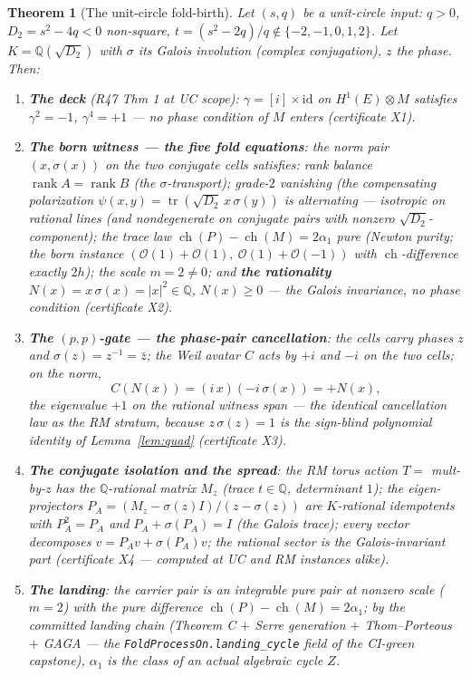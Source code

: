 \documentclass[11pt]{article}
\newcommand{\Oo}{\mathcal O}
\newcommand{\ch}{\operatorname{ch}}
\newcommand{\tr}{\operatorname{tr}}
\newcommand{\Q}{\mathbb Q}
\newtheorem{theorem}{Theorem}[section]
\begin{document}
\begin{theorem}[The unit-circle fold-birth]\label{thm:ucfold}
Let $(s,q)$ be a unit-circle input: $q>0$, $D_2=s^2-4q<0$ non-square,
$t=(s^2-2q)/q\notin\{-2,-1,0,1,2\}$. Let $K=\Q(\sqrt{D_2})$ with
$\sigma$ its Galois involution (complex conjugation), $z$ the phase.
Then:
\begin{enumerate}[label=(\roman*)]
\item \textbf{The deck} (R47 Thm 1 at UC scope): $\gamma=[i]\times
\mathrm{id}$ on $H^1(E)\otimes M$ satisfies $\gamma^2=-1$,
$\gamma^4=+1$ --- no phase condition of $M$ enters (certificate X1).
\item \textbf{The born witness --- the five fold equations}: the norm
pair $(x,\sigma(x))$ on the two conjugate cells satisfies:
rank balance $\operatorname{rank}A=\operatorname{rank}B$
(the $\sigma$-transport); grade-$2$ vanishing (the compensating
polarization $\psi(x,y)=\tr(\sqrt{D_2}\,x\,\sigma(y))$ is
alternating --- isotropic on rational lines (and nondegenerate on
conjugate pairs with nonzero $\sqrt{D_2}$-component); the trace law $\ch(P)-\ch(M)=2\alpha_1$ pure (Newton purity;
the born instance $(\Oo(1)+\Oo(1),\ \Oo(1)+\Oo(-1))$ with
$\ch$-difference exactly $2h$); the scale $m=2\ne0$; and
\textbf{the rationality} $N(x)=x\,\sigma(x)=|x|^2\in\Q$,
$N(x)\ge0$ --- the Galois invariance, no phase condition
(certificate X2).
\item \textbf{The $(p,p)$-gate --- the phase-pair cancellation}:
the cells carry phases $z$ and $\sigma(z)=z^{-1}=\bar z$; the Weil
avatar $C$ acts by $+i$ and $-i$ on the two cells; on the norm,
\[
C(N(x))=(i\,x)(-i\,\sigma(x))=+N(x),
\]
the eigenvalue $+1$ on the rational witness span --- the
\emph{identical} cancellation law as the RM stratum, because
$z\,\sigma(z)=1$ is the sign-blind polynomial identity of
Lemma~\ref{lem:quad} (certificate X3).
\item \textbf{The conjugate isolation and the spread}: the RM torus
action $T=$ mult-by-$z$ has the $\Q$-rational matrix $M_z$ (trace
$t\in\Q$, determinant $1$); the eigen-projectors
$P_A=(M_z-\sigma(z)I)/(z-\sigma(z))$ are $K$-rational idempotents
with $P_A^2=P_A$ and $P_A+\sigma(P_A)=I$ (the Galois trace); every
vector decomposes $v=P_Av+\sigma(P_A)v$; the rational sector is the
Galois-invariant part (certificate X4 --- computed at UC and RM
instances alike).
\item \textbf{The landing}: the carrier pair is an integrable pure
pair at nonzero scale ($m=2$) with the pure difference
$\ch(P)-\ch(M)=2\alpha_1$; by the committed landing chain
(Theorem C $+$ Serre generation $+$ Thom--Porteous $+$ GAGA --- the
\texttt{FoldProcessOn.landing\_cycle} field of the CI-green capstone),
$\alpha_1$ is the class of an actual algebraic cycle $Z$.
\end{enumerate}
\end{theorem}
\end{document}
